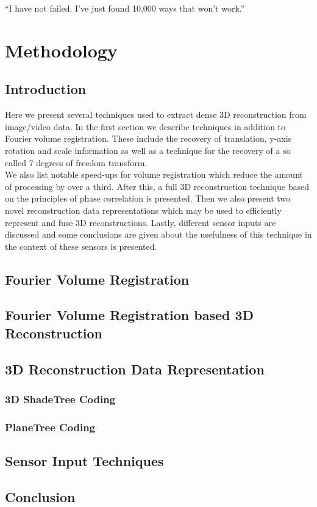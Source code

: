 \begin{savequote}[8cm]
  ``I have not failed. I've just found 10,000 ways that won't work.''
\end{savequote}
\makeatletter
\chapter{Methodology}

\section{Introduction}

Here we present several techniques used to extract dense 3D reconstruction from image/video data. In the first section we describe techniques in addition to Fourier volume registration. These include the recovery of translation, y-axis rotation and scale information as well as a technique for the recovery of a so called 7 degrees of freedom transform. \\

We also list notable speed-ups for volume registration which reduce the amount of processing by over a third. After this, a full 3D reconstruction technique based on the principles of phase correlation is presented. Then we also present two novel reconstruction data representations which may be used to efficiently represent and fuse 3D reconstructions. Lastly, different sensor inputs are discussed and some conclusions are given about the usefulness of this technique in the context of these sensors is presented.

\section{Fourier Volume Registration} 







\section{Fourier Volume Registration based 3D Reconstruction}



\section{3D Reconstruction Data Representation}

\subsection{3D ShadeTree Coding}

\subsection{PlaneTree Coding}

\section{Sensor Input Techniques}



\section{Conclusion}